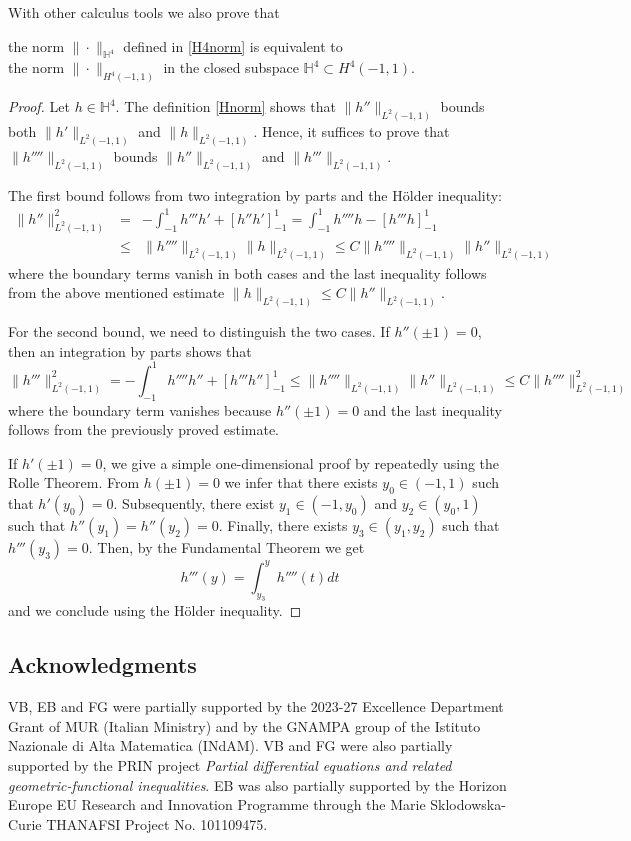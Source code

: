 \documentclass[11pt,a4paper]{amsart}
\theoremstyle{remark}
\theoremstyle{definition}
\numberwithin{equation}{section}
\numberwithin{proposition}{section}
\begin{document}
With other calculus tools we also prove that
\begin{center}
the norm $\|\cdot\|_{\mathbb{H}^4}$ defined in \eqref{H4norm}
is equivalent to \\the norm $\|\cdot\|_{H^4(-1,1)}$ in the closed subspace	$\mathbb{H}^4\subset H^4(-1,1)$.
\end{center}
\begin{proof} Let $h\in\mathbb{H}^4$. The definition \eqref{Hnorm} shows that $\|h''\|_{L^2(-1,1)}$ bounds both $\|h'\|_{L^2(-1,1)}$ and $\|h\|_{L^2(-1,1)}$. Hence, it suffices to prove that
$\|h''''\|_{L^2(-1,1)}$ bounds $\|h''\|_{L^2(-1,1)}$ and $\|h'''\|_{L^2(-1,1)}$.\par
The first bound follows from two integration by parts and the H\"older inequality:
\begin{eqnarray*}
\|h''\|_{L^2(-1,1)}^2 &=& -\int_{-1}^{1}h'''h'+[h''h']_{-1}^1=\int_{-1}^{1}h''''h-[h'''h]_{-1}^1\\
&\le& \|h''''\|_{L^2(-1,1)}\|h\|_{L^2(-1,1)}\le C\|h''''\|_{L^2(-1,1)}\|h''\|_{L^2(-1,1)}
\end{eqnarray*}
where the boundary terms vanish in both cases and the last inequality follows from the above mentioned estimate $\|h\|_{L^2(-1,1)}\le C\|h''\|_{L^2(-1,1)}$.\par
For the second bound, we need to distinguish the two cases. If $h''(\pm1)=0$, then an integration by parts shows that
$$
\|h'''\|_{L^2(-1,1)}^2 = -\int_{-1}^{1}h''''h''+[h'''h'']_{-1}^1\le\|h''''\|_{L^2(-1,1)}\|h''\|_{L^2(-1,1)}\le C\|h''''\|_{L^2(-1,1)}^2
$$
where the boundary term vanishes because $h''(\pm1)=0$ and the last inequality follows from the previously proved estimate.\par
If $h'(\pm1)=0$, we give a simple one-dimensional proof by repeatedly using the Rolle Theorem. From $h(\pm1)=0$ we infer that there exists $y_0\in(-1,1)$ such that $h'(y_0)=0$.
Subsequently, there exist $y_1\in(-1,y_0)$ and $y_2\in(y_0,1)$ such that $h''(y_1)=h''(y_2)=0$. Finally, there exists $y_3\in(y_1,y_2)$ such that $h'''(y_3)=0$.
Then, by the Fundamental Theorem we get
$$
h'''(y)=\int_{y_3}^{y}h''''(t)dt
$$
and we conclude using the H\"{o}lder inequality.\end{proof}


\subsection*{Acknowledgments}
VB, EB and FG  were partially supported by the 2023-27 Excellence Department Grant of MUR (Italian Ministry) and by the GNAMPA group of the Istituto Nazionale di Alta Matematica (INdAM). VB and FG were also partially supported by the PRIN project {\it Partial differential equations and related geometric-functional inequalities}.
EB was also partially supported by the Horizon Europe EU Research and Innovation Programme through the Marie Sklodowska-Curie THANAFSI Project No. 101109475.
\end{document}
